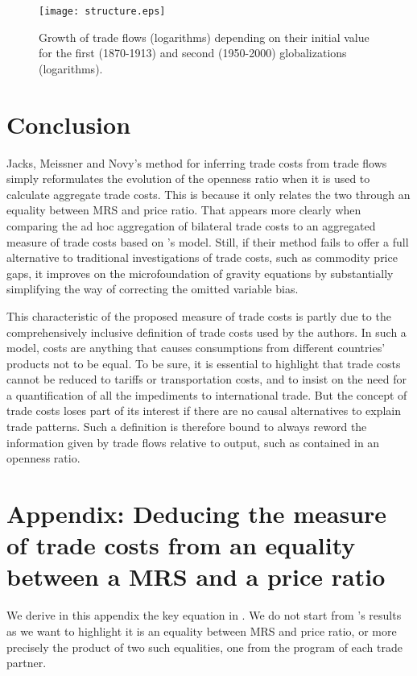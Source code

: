 \documentclass{article}
\begin{document}
\begin{figure}
\centering
\texttt{[image: structure.eps]}
\caption{Growth of trade flows (logarithms) depending on their initial value for the first (1870-1913) and second (1950-2000) globalizations (logarithms).}\label{structure}
\end{figure}

\section{\label{5} Conclusion}

Jacks, Meissner and Novy's method for inferring trade costs
from trade flows simply reformulates the evolution of the
openness ratio when it is used to calculate aggregate trade
costs. This is because it only relates the two through an
equality between MRS and price ratio. That appears more clearly
when comparing the ad hoc aggregation of bilateral trade costs
to an aggregated measure of trade costs based on
\cite{AW2003}'s model. Still, if their method fails to offer a
full alternative to traditional investigations of trade costs,
such as commodity price gaps, it improves on the
microfoundation of gravity equations by substantially
simplifying the way of correcting the omitted variable bias.

This characteristic of the proposed measure of trade costs is
partly due to the comprehensively inclusive definition of trade
costs used by the authors. In such a model, costs are anything
that causes consumptions from different countries' products not
to be equal. To be sure, it is essential to highlight that
trade costs cannot be reduced to tariffs or transportation
costs, and to insist on the need for a quantification of all
the impediments to international trade. But the concept of
trade costs loses part of its interest if there are no causal
alternatives to explain trade patterns. Such a definition is
therefore bound to always reword the information given by trade
flows relative to output, such as contained in an openness
ratio.

\appendix

\section{\label{A1}Appendix: Deducing the measure of trade costs from an equality between a MRS and a price ratio}

We derive in this appendix the key equation in \cite{JMN2011}.
We do not start from \cite{AW2003}'s results as we want to
highlight it is an equality between MRS and price ratio, or
more precisely the product of two such equalities, one from the
program of each trade partner.
\end{document}
